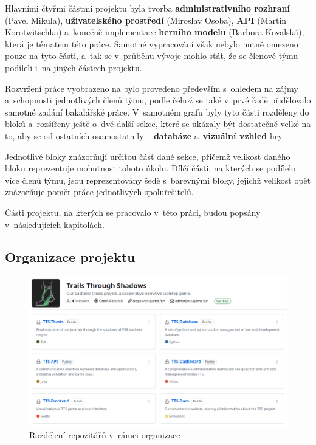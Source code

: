 Hlavními čtyřmi částmi projektu byla tvorba \textbf{administrativního rozhraní} (Pavel Mikula), \textbf{uživatelského prostředí} (Miroslav Osoba), \textbf{API} (Martin Korotwitschka) a~konečně implementace \textbf{herního modelu} (Barbora Kovalská), která je tématem této práce. Samotné vypracování však nebylo nutně omezeno pouze na tyto části, a~tak se v~průběhu vývoje mohlo stát, že se členové týmu podíleli i~na jiných částech projektu.

Rozvržení práce vyobrazeno na  bylo provedeno především s~ohledem na zájmy a~schopnosti jednotlivých členů týmu, podle čehož se také v~prvé řadě přidělovalo samotné zadání bakalářské práce. V~samotném grafu byly tyto části rozděleny do bloků a~rozšířeny ještě o~dvě další sekce, které se ukázaly být dostatečně velké na to, aby se od ostatních osamostatnily -- \textbf{databáze} a~\textbf{vizuální vzhled} hry. 

Jednotlivé bloky znázorňují určitou část dané sekce, přičemž velikost daného bloku reprezentuje mohutnost tohoto úkolu. Dílčí části, na kterých se podílelo více členů týmu, jsou reprezentovány šedě s~barevnými bloky, jejichž velikost opět znázorňuje poměr práce jednotlivých spoluřešitelů.

Části projektu, na kterých se pracovalo v~této práci, budou popsány v~následujících kapitolách.

\subsection{Organizace projektu}
\label{subsec:versioning}

\begin{figure}[h]
    \centering
    \includegraphics[width=\textwidth]{../../shared/figures/gitOrg.png}
    \caption{Rozdělení repozitářů v~rámci organizace}
    \label{fig:git_organization}
\end{figure}

